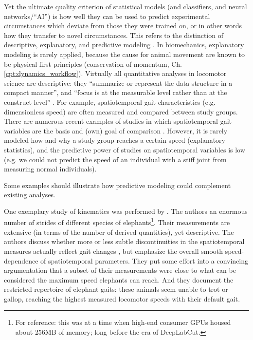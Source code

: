 Yet the ultimate quality criterion of statistical models (and classifiers, and neural networks/``AI'') is how well they can be used to predict experimental circumstances which deviate from those they were trained on, or in other words how they transfer to novel circumstances.
This refers to the distinction of descriptive, explanatory, and predictive modeling \citep{Shmueli2010,Shmueli2011}.
In biomechanics, explanatory modeling is rarely applied, because the cause for animal movement are known to be physical first principles (conservation of momentum, Ch. \ref{cpt:dynamics_workflow}).
Virtually all quantitative analyses in locomotor science are descriptive: they ``summarize or represent the data structure in a compact manner'', and ``focus is at the measurable level rather than at the construct level'' \citep{Shmueli2010}.
For example, spatiotemporal gait characteristics (e.g. dimensionless speed) are often measured and compared between study groups.
There are numerous recent examples of studies in which spatiotemporal gait variables are the basis and (own) goal of comparison  \citep[e.g.][]{Cheu2022,Ekhator2023,Plocek2023,Young2023,Jones2023,Druelle2021,McHenry2023}.
However, it is rarely modeled how and why a study group reaches a certain speed (explanatory statistics), and the predictive power of studies on spatiotemporal variables is low (e.g. we could not predict the speed of an individual with a stiff joint from measuring normal individuals).


\bigskip
Some examples should illustrate how predictive modeling could complement existing analyses.

One exemplary study of kinematics was performed by \citet{Hutchinson2006}.
The authors  an enormous number of strides of different species of elephants\footnote{For reference: this was at a time when high-end consumer GPUs housed about 256MB of memory; long before the era of DeepLabCut.}.
Their measurements are extensive (in terms of the number of derived quantities), yet descriptive.
The authors discuss whether more or less subtle discontinuities in the spatiotemporal measures actually reflect gait changes \citep{Alexander1989}, but emphasize the overall smooth speed-dependence of spatiotemporal parameters.
They put some effort into a convincing argumentation that a subset of their measurements were close to what can be considered the maximum speed elephants can reach.
And they document the restricted repertoire of elephant gaits: these animals seem unable to trot or gallop, reaching the highest measured locomotor speeds with their default gait.

